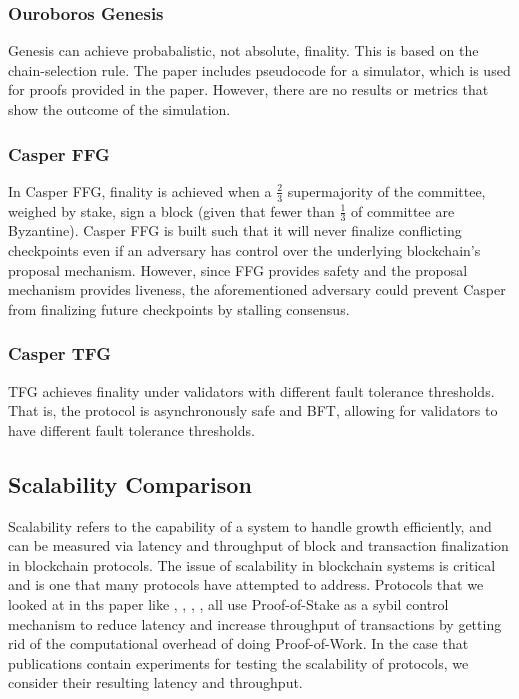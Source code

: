 \documentclass[10pt,journal,compsoc]{IEEEtran}
\begin{document}
\subsubsection{Ouroboros Genesis} Genesis can achieve probabalistic, not absolute, finality. This is based on the chain-selection rule. The paper includes pseudocode for a simulator, which is used for proofs provided in the paper. However, there are no results or metrics that show the outcome of the simulation. 

\subsubsection{Casper FFG} In Casper FFG, finality is achieved when a \(\frac{2}{3}\) supermajority of the committee, weighed by stake, sign a block (given that fewer than \(\frac{1}{3}\) of committee are Byzantine). Casper FFG is built such that it will never finalize conflicting checkpoints even if an adversary has control over the underlying blockchain's proposal mechanism. However, since FFG provides safety and the proposal mechanism provides liveness, the aforementioned adversary could prevent Casper from finalizing future checkpoints by stalling consensus.

\subsubsection{Casper TFG} TFG achieves finality under validators with different fault tolerance thresholds. That is, the protocol is asynchronously safe and BFT, allowing for validators to have different fault tolerance thresholds.

\subsection{Scalability Comparison}
Scalability refers to the capability of a system to handle growth efficiently, and can be measured via latency and throughput of block and transaction finalization in blockchain protocols. The issue of scalability in blockchain systems is critical and is one that many protocols have attempted to address. Protocols that we looked at in ths paper like \cite{TFG}, \cite{FFG}, \cite{Dfinity}, \cite{Gilad}, \cite{SnowWhite} all use Proof-of-Stake as a sybil control mechanism to reduce latency and increase throughput of transactions by getting rid of the computational overhead of doing Proof-of-Work. In the case that publications contain experiments for testing the scalability of protocols, we consider their resulting latency and throughput. 
\end{document}
